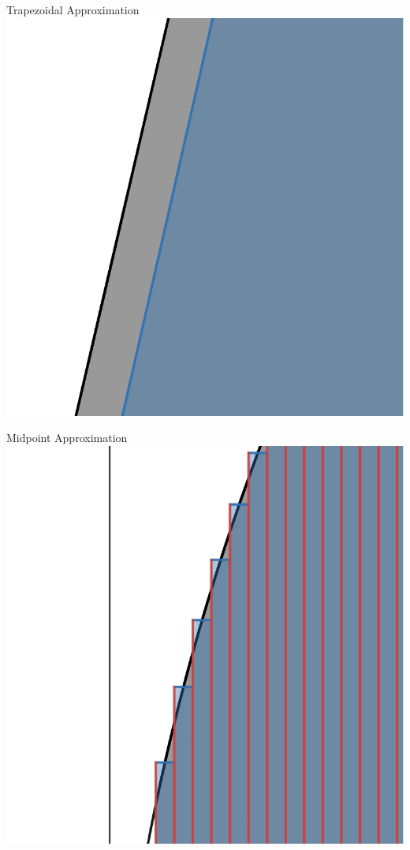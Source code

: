 \documentclass[letterpaper,12pt]{article}
\theoremstyle{definition}
\begin{document}
\vspace{1cm}

\begin{minipage}{0.45\textwidth}
 \begin{center}
  Trapezoidal Approximation
  \vskip 16pt
  \includegraphics[scale=0.25]{trapezoid1.png}
 \end{center}
\end{minipage}
\hfill
\begin{minipage}{0.45\textwidth}
 \begin{center}
  Midpoint Approximation
  \vskip 16pt
  \includegraphics[scale=0.25]{midpoint1.png}
 \end{center}
\end{minipage}
\end{document}
